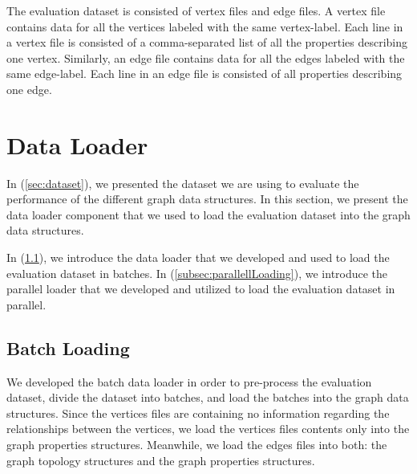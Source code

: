 {The evaluation dataset is consisted of vertex files and edge files. A vertex file contains data for all the vertices labeled with the same vertex-label. Each line in a vertex file is consisted of a comma-separated list of all the properties describing one vertex. Similarly, an edge file contains data for all the edges labeled with the same edge-label. Each line in an edge file is consisted of all properties describing one edge.

\section{Data Loader}
\label{sec:dataLoader}

In (\ref{sec:dataset}), we presented the dataset we are using to evaluate the performance of the different graph data structures. In this section, we present the data loader component that we used to load the evaluation dataset into the graph data structures.

In (\ref{subsec:batchLoading}), we introduce the data loader that we developed and used to load the evaluation dataset in batches. In (\ref{subsec:parallellLoading}), we introduce the parallel loader that we developed and utilized to load the evaluation dataset in parallel.


\subsection{Batch Loading}
\label{subsec:batchLoading}

We developed the batch data loader in order to pre-process the evaluation dataset, divide the dataset into batches, and load the batches into the graph data structures. Since the vertices files are containing no information regarding the relationships between the vertices, we load the vertices files contents only into the graph properties structures. Meanwhile, we load the edges files into both: the graph topology structures and the graph properties structures.\newline



 
}
